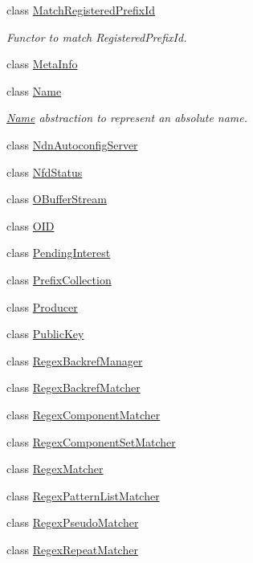 \begin{DoxyCompactItemize}
class \hyperlink{classndn_1_1MatchRegisteredPrefixId}{Match\+Registered\+Prefix\+Id}
\begin{DoxyCompactList}\small\item\em Functor to match Registered\+Prefix\+Id. \end{DoxyCompactList}\item 
class \hyperlink{classndn_1_1MetaInfo}{Meta\+Info}
\item 
class \hyperlink{classndn_1_1Name}{Name}
\begin{DoxyCompactList}\small\item\em \hyperlink{classndn_1_1Name}{Name} abstraction to represent an absolute name. \end{DoxyCompactList}\item 
class \hyperlink{classndn_1_1NdnAutoconfigServer}{Ndn\+Autoconfig\+Server}
\item 
class \hyperlink{classndn_1_1NfdStatus}{Nfd\+Status}
\item 
class \hyperlink{classndn_1_1OBufferStream}{O\+Buffer\+Stream}
\item 
class \hyperlink{classndn_1_1OID}{O\+ID}
\item 
class \hyperlink{classndn_1_1PendingInterest}{Pending\+Interest}
\item 
class \hyperlink{classndn_1_1PrefixCollection}{Prefix\+Collection}
\item 
class \hyperlink{classndn_1_1Producer}{Producer}
\item 
class \hyperlink{classndn_1_1PublicKey}{Public\+Key}
\item 
class \hyperlink{classndn_1_1RegexBackrefManager}{Regex\+Backref\+Manager}
\item 
class \hyperlink{classndn_1_1RegexBackrefMatcher}{Regex\+Backref\+Matcher}
\item 
class \hyperlink{classndn_1_1RegexComponentMatcher}{Regex\+Component\+Matcher}
\item 
class \hyperlink{classndn_1_1RegexComponentSetMatcher}{Regex\+Component\+Set\+Matcher}
\item 
class \hyperlink{classndn_1_1RegexMatcher}{Regex\+Matcher}
\item 
class \hyperlink{classndn_1_1RegexPatternListMatcher}{Regex\+Pattern\+List\+Matcher}
\item 
class \hyperlink{classndn_1_1RegexPseudoMatcher}{Regex\+Pseudo\+Matcher}
\item 
class \hyperlink{classndn_1_1RegexRepeatMatcher}{Regex\+Repeat\+Matcher}
\item 

\end{DoxyCompactItemize}
